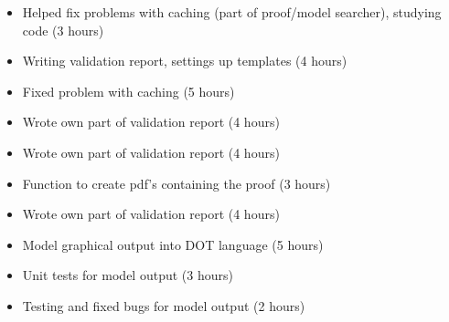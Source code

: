 %
{ \begin{itemize} 
  \item Helped fix problems with caching (part of proof/model searcher), studying code (3 hours)
 \item  Writing validation report, settings up templates (4 hours)
 \end{itemize} 
}%
{ \begin{itemize} 
 \item Fixed problem with caching (5 hours)
 \item Wrote own part of validation report (4 hours)
 \end{itemize} 
}%
{ \begin{itemize} 
 \item Wrote own part of validation report (4 hours)
 \item Function to create pdf's containing the proof (3 hours)
 \end{itemize} 
}%
{ \begin{itemize} 
  \item Wrote own part of validation report (4 hours)
 \item Model graphical output into DOT language (5 hours)
 \item Unit tests for model output (3 hours)
 \item Testing and fixed bugs for model output (2 hours)
 \end{itemize} 
}%
